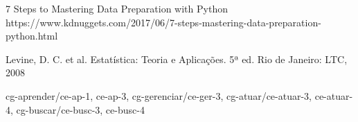 {{        7 Steps to Mastering Data Preparation with Python
        https://www.kdnuggets.com/2017/06/7-steps-mastering-data-preparation-python.html

        Levine, D. C. et al. Estatística: Teoria e Aplicações. 5ª ed. Rio de Janeiro: LTC, 2008

    }
   \competencias
    {
        cg-aprender/{ce-ap-1, ce-ap-3},
        cg-gerenciar/{ce-ger-3},
        cg-atuar/{ce-atuar-3, ce-atuar-4},
        cg-buscar/{ce-busc-3, ce-busc-4}        
    }
}